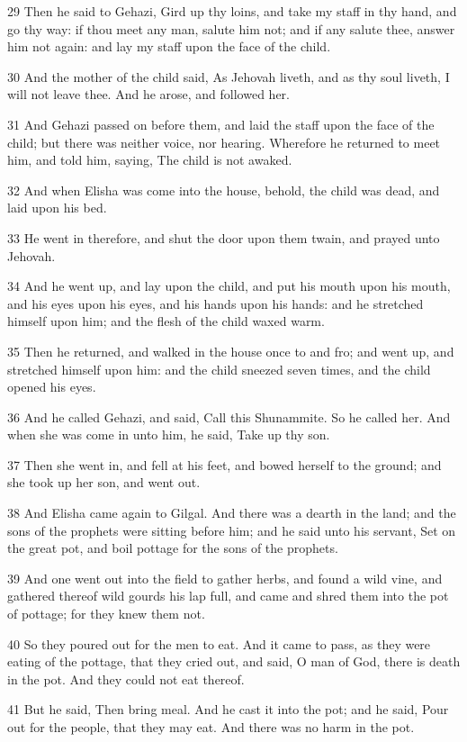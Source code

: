 \par 29 Then he said to Gehazi, Gird up thy loins, and take my staff in thy hand, and go thy way: if thou meet any man, salute him not; and if any salute thee, answer him not again: and lay my staff upon the face of the child.
\par 30 And the mother of the child said, As Jehovah liveth, and as thy soul liveth, I will not leave thee. And he arose, and followed her.
\par 31 And Gehazi passed on before them, and laid the staff upon the face of the child; but there was neither voice, nor hearing. Wherefore he returned to meet him, and told him, saying, The child is not awaked.
\par 32 And when Elisha was come into the house, behold, the child was dead, and laid upon his bed.
\par 33 He went in therefore, and shut the door upon them twain, and prayed unto Jehovah.
\par 34 And he went up, and lay upon the child, and put his mouth upon his mouth, and his eyes upon his eyes, and his hands upon his hands: and he stretched himself upon him; and the flesh of the child waxed warm.
\par 35 Then he returned, and walked in the house once to and fro; and went up, and stretched himself upon him: and the child sneezed seven times, and the child opened his eyes.
\par 36 And he called Gehazi, and said, Call this Shunammite. So he called her. And when she was come in unto him, he said, Take up thy son.
\par 37 Then she went in, and fell at his feet, and bowed herself to the ground; and she took up her son, and went out.
\par 38 And Elisha came again to Gilgal. And there was a dearth in the land; and the sons of the prophets were sitting before him; and he said unto his servant, Set on the great pot, and boil pottage for the sons of the prophets.
\par 39 And one went out into the field to gather herbs, and found a wild vine, and gathered thereof wild gourds his lap full, and came and shred them into the pot of pottage; for they knew them not.
\par 40 So they poured out for the men to eat. And it came to pass, as they were eating of the pottage, that they cried out, and said, O man of God, there is death in the pot. And they could not eat thereof.
\par 41 But he said, Then bring meal. And he cast it into the pot; and he said, Pour out for the people, that they may eat. And there was no harm in the pot.
